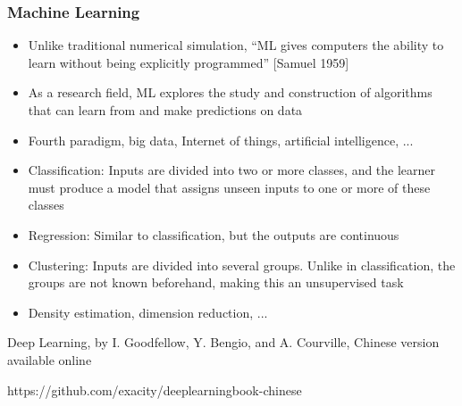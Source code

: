 \begin{frame}
  \MyLogo
  \frametitle{Machine Learning}  
\small

\medskip

\begin{itemize}

\item Unlike traditional numerical simulation, ``ML gives computers the ability to learn without being explicitly programmed'' {\footnotesize\color{DarkOrchid}[Samuel 1959]}

\item As a research field, ML explores the study and construction of algorithms that can {learn} from and {make predictions} on \alert{data}

\item Fourth paradigm, big data, Internet of things, artificial intelligence, ...

\end{itemize}


\begin{itemize}

\item[\raisebox{-0.4ex}{\alert{\HandRight}}] Classification: Inputs are divided into two or more classes, and the learner must produce a model that assigns unseen inputs to one or more of these classes

\item[\raisebox{-0.4ex}{\alert{\HandRight}}] Regression: Similar to classification, but the outputs are continuous

\item Clustering: Inputs are divided into several groups. Unlike in classification, the groups are not known beforehand, making this an unsupervised task

\item Density estimation, dimension reduction, ...

\end{itemize}

\vfill
\begin{center}
{\color{red} \scriptsize
Deep Learning, by I. Goodfellow, Y. Bengio, and A. Courville, Chinese version available online

https://github.com/exacity/deeplearningbook-chinese
}
\end{center}
\end{frame}


